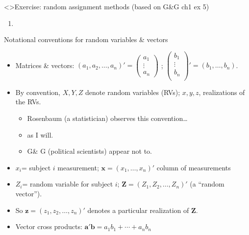 \begin{frame}<\nottheirhandout>{Exercise: random assignment methods}
{\footnotesize (based on G\&G ch1 ex 5)}

\begin{enumerate} \addtocounter{enumi}{8}
\item

\end{enumerate}

\end{frame}





\begin{frame}{Notational conventions for random variables \& vectors}
  
  \begin{itemize}
\item Matrices \& vectors: $(a_{1}, a_{2}, \ldots, a_{n})' = \left(
    \begin{array}{c}
      a_{1} \\ \vdots \\ a_{n}
    \end{array}
\right)$ ;  $\left(
      \begin{array}{c}
        b_{1} \\  \vdots \\ b_{n}\\
      \end{array}
\right)' = (b_{1}, \ldots, b_{n})$.
  \item By convention, $X, Y, Z$ denote random variables (RVs); $x, y, z$, realizations of the RVs.
    \begin{itemize}
    \item Rosenbaum (a statistician) observes this convention\ldots
    \item as I will.
    \item G\& G (political scientists) appear not to.
    \end{itemize}
 \item $x_{i}$= subject $i$ measurement; $\mathbf{x} =(x_{1}, \ldots, x_{n})'$ column of measurements
  \item $Z_i$= random variable for subject $i$; $\mathbf{Z}=(Z_1, Z_2,
    \ldots, Z_n)'$ (a ``random vector'').  
  \item So $\mathbf{z}=(z_1, z_2, \ldots, z_n)'$ denotes a particular
    realization of $\mathbf{Z} $.
  \item Vector cross products: $\mathbf{a}'\mathbf{b}  = a_{1}b_{1} + \cdots + a_{n}b_{n}$
  \end{itemize}


\end{frame}

